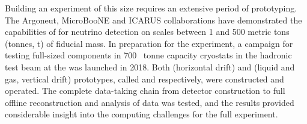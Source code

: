 \documentclass[../main-v1.tex]{subfiles}
\begin{document}
Building an experiment of this size requires an extensive period of prototyping.   The Argoneut\cite{Acciarri:2018myr}, MicroBooNE\cite{microboone} and ICARUS\cite{icarus} collaborations have demonstrated the capabilities of  for neutrino detection on scales between 1 and 500 metric tons (tonnes, t) of fiducial mass.  In preparation for the  experiment, a campaign for testing %
full-sized  components in 700 ~tonne  capacity cryostats %
in the  hadronic test beam at the  was launched in 2018.  Both  (horizontal drift) and  (liquid and gas, vertical drift) prototypes, called  and  respectively, were constructed and operated. %
The complete data-taking chain from detector construction to full offline reconstruction and analysis of data was tested, and the results provided considerable insight into the computing challenges for the full  experiment.
\end{document}
